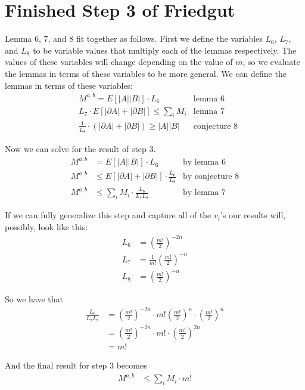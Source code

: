 \section{Finished Step 3 of Friedgut}

	Lemma 6, 7, and 8 fit together as follows. First we define the variables $L_6$, $L_7$, and $L_8$ to be variable values that multiply each of the lemmas respectively. The values of these variables will change depending on the value of $m$, so we evaluate the lemmas in terms of these variables to be more general. We can define the lemmas in terms of these variables:
	\begin{align*}
		&M^{a,b} = E[|A||B|] \cdot L_6 & \textrm{lemma 6} \\
		&L_7 \cdot E[|\partial A| + |\partial B|] \le \sum_i M_i & \textrm{lemma 7} \\
		&\frac{1}{L_8} \cdot (|\partial A| + |\partial B|) \ge |A||B| & \textrm{conjecture 8}
	\end{align*}

	Now we can solve for the result of step 3.
	\begin{align*}
		M^{a,b} &= E[|A||B|] \cdot L_6 & \textrm{by lemma 6} \\
		M^{a,b} &\le E[|\partial A| + |\partial B|] \cdot \frac{L_6}{L_8} & \textrm{by conjecture 8} \\
		M^{a,b} &\le \sum_i M_i \cdot \frac{L_6}{L_7L_8} & \textrm{by lemma 7}
	\end{align*}

	If we can fully generalize this step and capture all of the $v_i$'s our results will, possibly, look like this:
	\begin{align*}
		L_6 &= \left(\frac{m!}{2}\right)^{-2n} \\
		L_7 &= \frac{1}{m!}\left(\frac{m!}{2}\right)^{-n} \\
		L_8 &= \left(\frac{m!}{2}\right)^{-n}
	\end{align*}

	So we have that
	\begin{align*}
		\frac{L_6}{L_7L_8} &= \left(\frac{m!}{2}\right)^{-2n} \cdot m!\left(\frac{m!}{2}\right)^{n} \cdot \left(\frac{m!}{2}\right)^{n} \\
		&= \left(\frac{m!}{2}\right)^{-2n} \cdot m! \cdot \left(\frac{m!}{2}\right)^{2n} \\
		&= m!
	\end{align*}

	And the final result for step 3 becomes
	\begin{align*}
		M^{a,b} &\le \sum_i M_i \cdot m!
	\end{align*}

